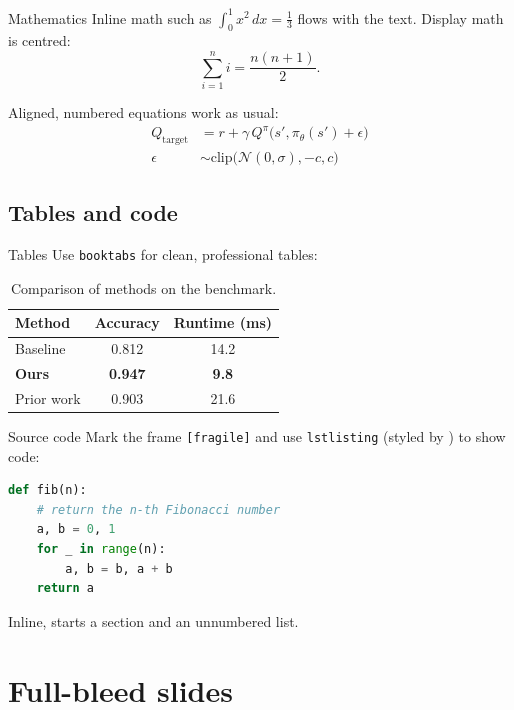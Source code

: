 \documentclass[aspectratio=169,onlytextwidth]{beamer}
\begin{document}
\begin{frame}{Mathematics}
  Inline math such as $\int_0^1 x^2 \, dx = \tfrac{1}{3}$ flows with the text.
  Display math is centred:
  \[
    \sum_{i=1}^{n} i = \frac{n(n+1)}{2}.
  \]

  Aligned, numbered equations work as usual:
  \begin{align}
    Q_{\text{target}} &= r + \gamma\, Q^\pi\big(s', \pi_\theta(s') + \epsilon\big) \\
    \epsilon &\sim \mathrm{clip}\big(\mathcal{N}(0,\sigma), -c, c\big) \nonumber
  \end{align}
\end{frame}

\subsection{Tables and code}

\begin{frame}{Tables}
  Use \texttt{booktabs} for clean, professional tables:

  \begin{table}
    \centering
    \begin{tabular}{lcc}
      \toprule
      Method & Accuracy & Runtime (ms) \\
      \midrule
      Baseline      & 0.812 & 14.2 \\
      \textbf{Ours} & \textbf{0.947} & \textbf{9.8} \\
      Prior work    & 0.903 & 21.6 \\
      \bottomrule
    \end{tabular}
    \caption{Comparison of methods on the benchmark.}
  \end{table}
\end{frame}

\begin{frame}[fragile]{Source code}
  Mark the frame \texttt{[fragile]} and use \texttt{lstlisting} (styled by
  ) to show code:

\begin{lstlisting}[language=Python]
def fib(n):
    # return the n-th Fibonacci number
    a, b = 0, 1
    for _ in range(n):
        a, b = b, a + b
    return a
\end{lstlisting}

  Inline,  starts a section and  an unnumbered list.
\end{frame}


\section{Full-bleed slides}
\end{document}

